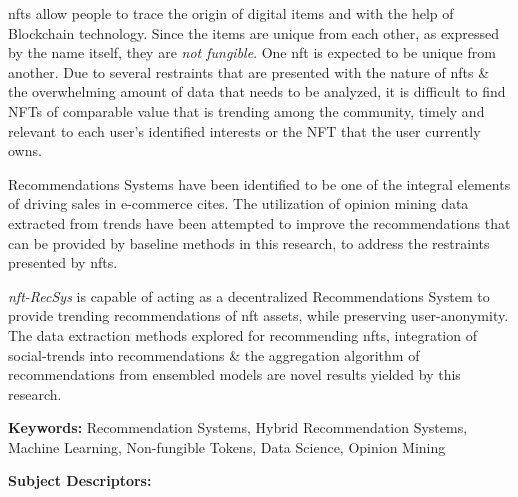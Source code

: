 
\gls{nft}s allow people to trace the origin of digital items and with the help of Blockchain technology. Since the items are unique from each other, as expressed by the name itself, they are \textit{not fungible}. One \gls{nft} is expected to be unique from another. 
Due to several restraints that are presented with the nature of \gls{nft}s \& the overwhelming amount of data that needs to be analyzed, it is difficult to find NFTs of comparable value that is trending among the community, timely and relevant to each user’s identified interests or the NFT that the user currently owns.

Recommendations Systems have been identified to be one of the integral elements of driving sales in e-commerce cites. The utilization of opinion mining data extracted from trends have been attempted to improve the recommendations that can be provided by baseline methods in this research, to address the restraints presented by \gls{nft}s.

\textit{\gls{nft}-RecSys} is capable of acting as a decentralized Recommendations System to provide trending recommendations of \gls{nft} assets, while preserving user-anonymity. The data extraction methods explored for recommending \gls{nft}s, integration of social-trends into recommendations \& the aggregation algorithm of recommendations from ensembled models are novel results yielded by this research.

\bigbreak
\noindent\textbf{Keywords:} Recommendation Systems, Hybrid Recommendation Systems, Machine Learning, Non-fungible Tokens, Data Science, Opinion Mining

\bigbreak
\noindent\textbf{Subject Descriptors:}

